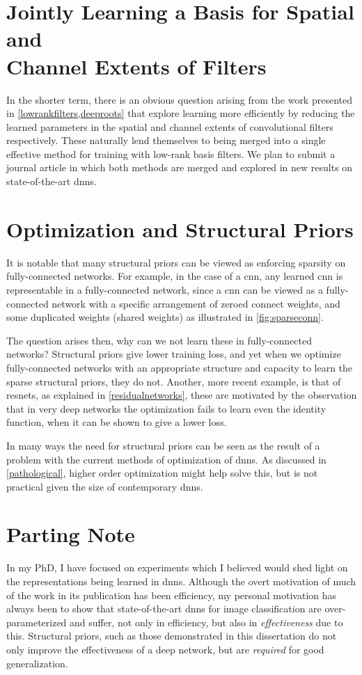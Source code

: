 \documentclass[thesis]{subfiles}
\begin{document}
\section[Jointly Learning a Basis for Spatial and Channel Extents of Filters]{Jointly Learning a Basis for Spatial and\\Channel Extents of Filters}
\label{journalplan}
In the shorter term, there is an obvious question arising from the work presented in \cref{lowrankfilters,deeproots} that explore learning more efficiently by reducing the learned parameters in the spatial and channel extents of convolutional filters respectively. These naturally lend themselves to being merged into a single effective method for training with low-rank basis filters. We plan to submit a journal article in which both methods are merged and explored in new results on state-of-the-art \glspl{dnn}.

\section{Optimization and Structural Priors}
It is notable that many structural priors can be viewed as enforcing sparsity on fully-connected networks. For example, in the case of a \gls{cnn}, any learned \gls{cnn} is representable in a fully-connected network, since a \gls{cnn} can be viewed as a fully-connected network with a specific arrangement of zeroed connect weights, and some duplicated weights (shared weights) as illustrated in \cref{fig:sparseconn}. 

The question arises then, why can we not learn these in fully-connected networks? Structural priors give lower training loss, and yet when we optimize fully-connected networks with an appropriate structure and capacity to learn the sparse structural priors, they do not. Another, more recent example, is that of \glspl{resnet}, as explained in \cref{residualnetworks}, these are motivated by the observation that in very deep networks the optimization fails to learn even the identity function, when it can be shown to give a lower loss.

In many ways the need for structural priors can be seen as the result of a problem with the current methods of optimization of \glspl{dnn}. As discussed in \cref{pathological}, higher order optimization might help solve this, but is not practical given the size of contemporary \glspl{dnn}. 

\section{Parting Note}
In my PhD, I have focused on experiments which I believed would shed light on the representations being learned in \glspl{dnn}. Although the overt motivation of much of the work in its publication has been efficiency, my personal motivation has always been to show that state-of-the-art \glspl{dnn} for image classification are over-parameterized and suffer, not only in efficiency, but also in \emph{effectiveness} due to this. Structural priors, such as those demonstrated in this dissertation do not only improve the effectiveness of a deep network, but are \emph{required} for good generalization.
\end{document}
